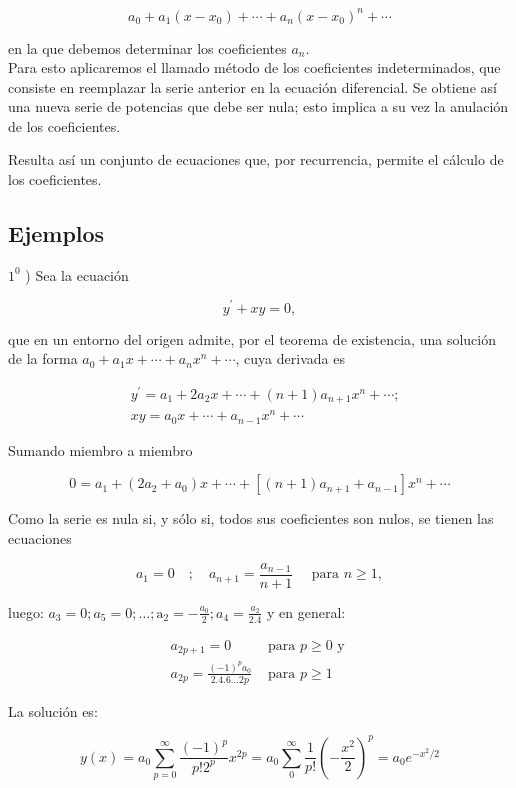 \documentclass[10pt]{article}
\theoremstyle{plain}
\theoremstyle{definition}
\theoremstyle{remark}
\begin{document}
$$
a_{0}+a_{1}\left(x-x_{0}\right)+\cdots+a_{n}\left(x-x_{0}\right)^{n}+\cdots
$$

en la que debemos determinar los coeficientes $a_{n}$.\\
Para esto aplicaremos el llamado método de los coeficientes indeterminados, que consiste en reemplazar la serie anterior en la ecuación diferencial. Se obtiene así una nueva serie de potencias que debe ser nula; esto implica a su vez la anulación de los coeficientes.

Resulta así un conjunto de ecuaciones que, por recurrencia, permite el cálculo de los coeficientes.

\subsection{Ejemplos}
$1^{0}$ ) Sea la ecuación

$$
y^{\prime}+x y=0,
$$

que en un entorno del origen admite, por el teorema de existencia, una solución de la forma $a_{0}+a_{1} x+\cdots+a_{n} x^{n}+\cdots$, cuya derivada es

$$
\begin{aligned}
& y^{\prime}=a_{1}+2 a_{2} x+\cdots+(n+1) a_{n+1} x^{n}+\cdots ; \\
& x y=a_{0} x+\cdots+a_{n-1} x^{n}+\cdots
\end{aligned}
$$

Sumando miembro a miembro

$$
0=a_{1}+\left(2 a_{2}+a_{0}\right) x+\cdots+\left[(n+1) a_{n+1}+a_{n-1}\right] x^{n}+\cdots
$$

Como la serie es nula si, y sólo si, todos sus coeficientes son nulos, se tienen las ecuaciones

$$
a_{1}=0 \quad ; \quad a_{n+1}=\frac{a_{n-1}}{n+1} \quad \text { para } n \geqslant 1,
$$

luego: $a_{3}=0 ; a_{5}=0 ; \ldots ; \mathrm{a}_{2}=-\frac{a_{0}}{2} ; a_{4}=\frac{a_{2}}{2.4}$ y en general:

$$
\begin{array}{ll}
a_{2 p+1}=0 & \text { para } p \geqslant 0 \text { y } \\
a_{2 p}=\frac{(-1)^{p} a_{0}}{2.4 .6 \ldots 2 p} & \text { para } p \geqslant 1
\end{array}
$$

La solución es:

$$
y(x)=a_{0} \sum_{p=0}^{\infty} \frac{(-1)^{p}}{p!2^{p}} x^{2 p}=a_{0} \sum_{0}^{\infty} \frac{1}{p!}\left(-\frac{x^{2}}{2}\right)^{p}=a_{0} e^{-x^{2} / 2}
$$
\end{document}
